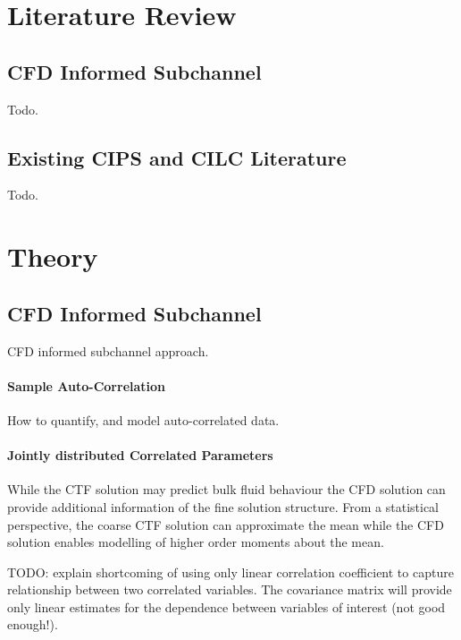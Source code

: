 \documentclass[10pt,a4paper]{report}
\begin{document}
\chapter{Literature Review}

\section{CFD Informed Subchannel}
Todo.

\section{Existing CIPS and CILC Literature}
Todo.

\chapter{Theory}

\section{CFD Informed Subchannel}

CFD informed subchannel approach.

\subsubsection{Sample Auto-Correlation}

How to quantify, and model auto-correlated data.

\subsubsection{Jointly distributed Correlated Parameters}

While the CTF solution may predict bulk fluid behaviour the CFD solution can provide additional information of the fine solution structure.  From a statistical perspective, the coarse CTF solution can approximate the mean while the CFD solution enables modelling of higher order moments about the mean.

TODO: explain shortcoming of using only linear correlation coefficient to capture relationship between two correlated variables. The covariance matrix will provide only linear estimates for the dependence between variables of interest (not good enough!). 
\end{document}
